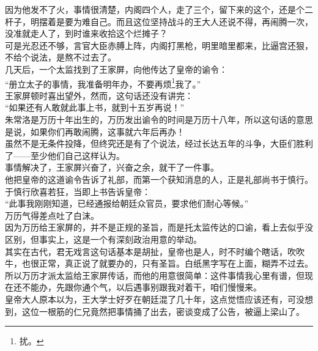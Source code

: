 \begin{multicols}{\theparacolNo}
因为他发不了火，事情很清楚，内阁四个人，走了三个，留下来的这个，还是个二杆子，明摆着是要为难自己。而且这位坚持战斗的王大人还说不得，再闹腾一次，没准就走人了，到时谁来收拾这个烂摊子？\\

可是光忍还不够，言官大臣赤膊上阵，内阁打黑枪，明里暗里都来，比逼宫还狠，不给个说法，是熬不过去了。\\

几天后，一个太监找到了王家屏，向他传达了皇帝的谕令：\\

“册立太子的事情，我准备明年办，不要再烦\footnote{扰。}我了。”\\

王家屏顿时喜出望外，然而，这句话还没有讲完：\\

“如果还有人敢就此事上书，就到十五岁再说！”\\

朱常洛是万历十年出生的，万历发出谕令的时间是万历十八年，所以这句话的意思是说，如果你们再敢闹腾，这事就六年后再办！\\

虽然不是无条件投降，但终究还是有了个说法，经过长达五年的斗争，大臣们胜利了——至少他们自己这样认为。\\

事情解决了，王家屏兴奋了，兴奋之余，就干了一件事。\\

他把皇帝的这道谕令告诉了礼部，而第一个获知消息的人，正是礼部尚书于慎行。\\

于慎行欣喜若狂，当即上书告诉皇帝：\\

“此事我刚刚知道，已经通报给朝廷众官员，要求他们耐心等候。”\\

万历气得差点吐了白沫。\\

因为万历给王家屏的，并不是正规的圣旨，而是托太监传达的口谕，看上去似乎没区别，但事实上，这是一个有深刻政治用意的举动。\\

其实在古代，君无戏言这句话基本是胡扯，皇帝也是人，时不时编个瞎话，吹吹牛，也很正常，真正说了就要办的，只有圣旨。白纸黑字写在上面，糊弄不过去。所以万历才派太监给王家屏传话，而他的用意很简单：这件事情我心里有谱，但现在还不能办，先跟你通个气，以后遇事别跟我对着干，咱们慢慢来。\\

皇帝大人原本以为，王大学士好歹在朝廷混了几十年，这点觉悟应该还有，可没想到，这位一根筋的仁兄竟然把事情捅了出去，密谈变成了公告，被逼上梁山了。\\


\end{multicols}
